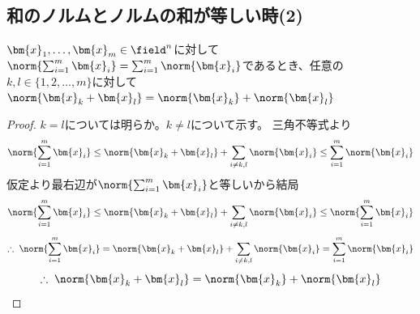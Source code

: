         \subsection{和のノルムとノルムの和が等しい時(2)}
            \begin{shadebox}
                $\bm{x}_1,\dotsc,\bm{x}_m\in\field^n$に対して$\norm{\sum_{i=1}^{m}{\bm{x}_i}}=\sum_{i=1}^{m}{\norm{\bm{x}_i}}$であるとき、任意の$k,l\in\{1,2,\dotsc,m\}$に対して$\norm{\bm{x}_k+\bm{x}_l}=\norm{\bm{x}_k}+\norm{\bm{x}_l}$
            \end{shadebox}
            \begin{proof}
                \quad\par
                $k=l$については明らか。$k\neq l$について示す。
                三角不等式より
                \[\norm{\sum_{i=1}^{m}{\bm{x}_i}} \leq \norm{\bm{x}_k+\bm{x}_l} + \sum_{i\neq k,l}{\norm{\bm{x}_i}} \leq \sum_{i=1}^{m}{\norm{\bm{x}_i}}\]
                仮定より最右辺が$\norm{\sum_{i=1}^{m}{\bm{x}_i}}$と等しいから結局
                \[\norm{\sum_{i=1}^{m}{\bm{x}_i}} \leq \norm{\bm{x}_k+\bm{x}_l} + \sum_{i\neq k,l}{\norm{\bm{x}_i}} \leq \norm{\sum_{i=1}^{m}{\bm{x}_i}}\]
                \[\therefore\; \norm{\sum_{i=1}^{m}{\bm{x}_i}} = \norm{\bm{x}_k+\bm{x}_l} + \sum_{i\neq k,l}{\norm{\bm{x}_i}} = \sum_{i=1}^{m}{\norm{\bm{x}_i}}\]
                \[\therefore\; \norm{\bm{x}_k+\bm{x}_l} = \norm{\bm{x}_k}+\norm{\bm{x}_l}\]
            \end{proof}
